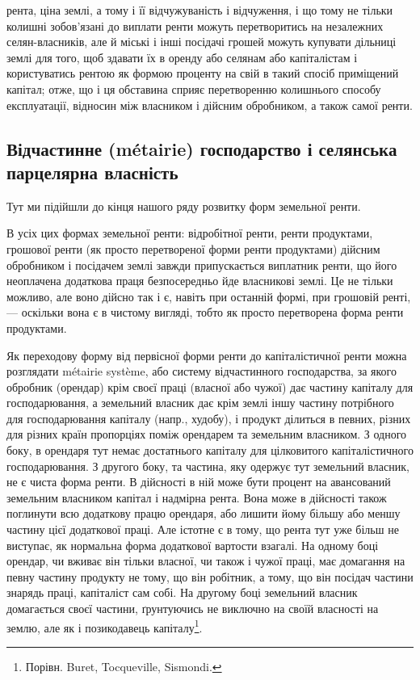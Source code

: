 \parcont{}  %
рента, ціна землі, а тому і її відчужуваність і відчуження, і що тому не тільки
колишні зобов’язані до виплати ренти можуть перетворитись на незалежних
селян-власників, але й міські і інші посідачі грошей можуть купувати дільниці
землі для того, щоб здавати їх в оренду або селянам або капіталістам
і користуватись рентою як формою проценту на свій в такий спосіб приміщений
капітал; отже, що і ця обставина сприяє перетворенню колишнього способу
експлуатації, відносин між власником і дійсним обробником, а також самої ренти.

\subsection[Відчастинне (métairie) господарство і селянська парцелярна власність]{%
Відчастинне (métairie)\footnotemarkZ{} господарство і селянська парцелярна власність}

Тут
% 
ми підійшли до кінця нашого ряду розвитку форм земельної ренти.

В усіх цих формах земельної ренти: відробітної ренти, ренти продуктами,
грошової ренти (як просто перетвореної форми ренти продуктами) дійсним
обробником і посідачем землі завжди припускається виплатник ренти, що його
неоплачена додаткова праця безпосередньо йде власникові землі. Це не тільки
можливо, але воно дійсно так і є, навіть при останній формі, при грошовій
ренті, — оскільки вона є в чистому вигляді, тобто як просто перетворена форма
ренти продуктами.

Як переходову форму від первісної форми ренти до капіталістичної ренти
можна розглядати métairie système, або систему відчастинного господарства, за якого
обробник (орендар) крім своєї праці (власної або чужої) дає частину капіталу
для господарювання, а земельний власник дає крім землі іншу частину потрібного
для господарювання капіталу (напр., худобу), і продукт ділиться в певних,
різних для різних країн пропорціях поміж орендарем та земельним власником.
З одного боку, в орендаря тут немає достатнього капіталу для цілковитого капіталістичного
господарювання. З другого боку, та частина, яку одержує тут
земельний власник, не є чиста форма ренти. В дійсності в ній може бути процент
на авансований земельним власником капітал і надмірна рента. Вона може
в дійсності також поглинути всю додаткову працю орендаря, або лишити йому
більшу або меншу частину цієї додаткової праці. Але істотне є в тому, що
рента тут уже більш не виступає, як нормальна форма додаткової вартости взагалі.
На одному боці орендар, чи вживає він тільки власної, чи також і чужої праці,
має домагання на певну частину продукту не тому, що він робітник, а тому,
що він посідач частини знарядь праці, капіталіст сам собі. На другому боці
земельний власник домагається своєї частини, ґрунтуючись не виключно на
своїй власності на землю, але як і позикодавець капіталу\footnote{
Порівн. Buret, Tocqueville, Sismondi.
}.

